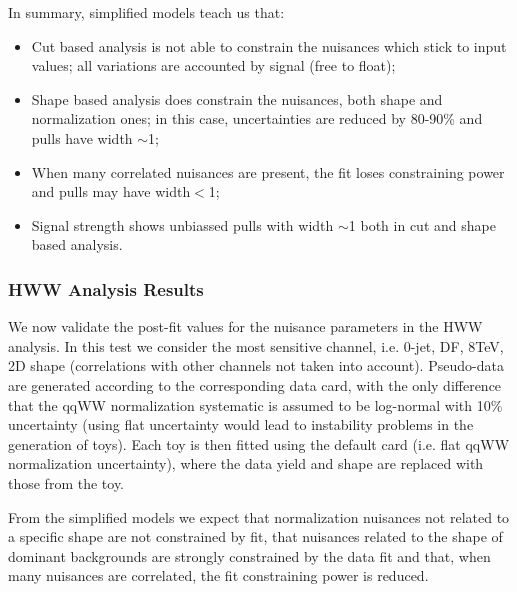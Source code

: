 In summary, simplified models teach us that:
\begin{itemize}
\item Cut based analysis is not able to constrain the nuisances which stick to input values; all variations are accounted by signal (free to float);
\item Shape based analysis does constrain the nuisances, both shape and normalization ones; 
in this case, uncertainties are reduced by 80-90\% and pulls have width $\sim$1;
\item When many correlated nuisances are present, the fit loses constraining power and pulls may have width$<$1;
\item Signal strength shows unbiassed pulls with width $\sim$1 both in cut and shape based analysis.
\end{itemize}

\clearpage

\subsubsection{HWW Analysis Results}

We now validate the post-fit values for the nuisance parameters in the HWW analysis.
In this test we consider the most sensitive channel, i.e. 0-jet, DF, 8TeV, 2D shape (correlations with other channels not taken into account).
Pseudo-data are generated according to the corresponding data card, with the only difference that the qqWW normalization systematic is assumed to be
log-normal with 10\% uncertainty (using flat uncertainty would lead to instability problems in the generation of toys).
Each toy is then fitted using the default card (i.e. flat qqWW normalization uncertainty), where the data yield and shape are replaced with those from the toy.

From the simplified models we expect that normalization nuisances not related to a specific shape are not constrained by fit, 
that nuisances related to the shape of dominant backgrounds are strongly constrained by the data fit and that, when many nuisances are correlated, 
the fit constraining power is reduced.

